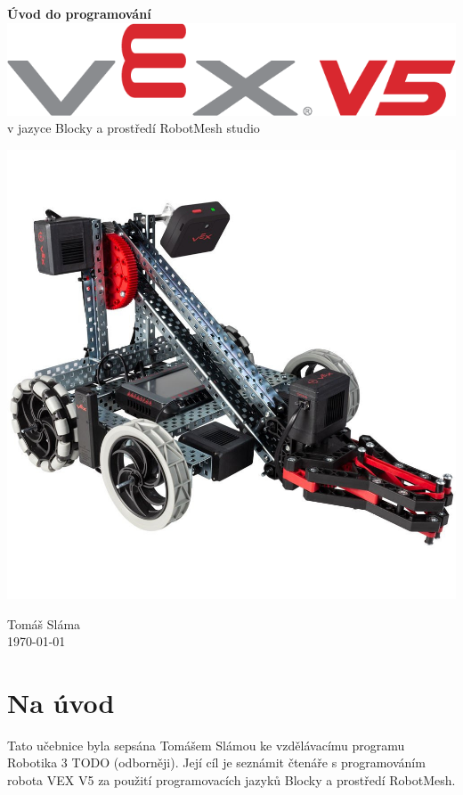 


\begin{titlepage}
    \begin{center}
        \vspace*{3em}
        \Huge
				\textbf{Úvod do programování} \includegraphics[height=0.65\baselineskip]{Images/vex-logo.png}
				\\
				\Large
        \vspace*{0.5em}
				v jazyce Blocky a prostředí RobotMesh studio

        \vfill
				\includegraphics[width=0.7\linewidth]{Images/robot.jpg}
        \vfill

        \flushright
        \normalsize
				Tomáš Sláma\\
				\today
    \end{center}
\end{titlepage}

\tableofcontents
\clearpage

\setcounter{secnumdepth}{0}
\section{Na úvod}
Tato učebnice byla sepsána Tomášem Slámou ke vzdělávacímu programu Robotika 3 TODO (odborněji). Její cíl je seznámit čtenáře s programováním robota VEX V5 za použití programovacích jazyků Blocky a prostředí RobotMesh.

